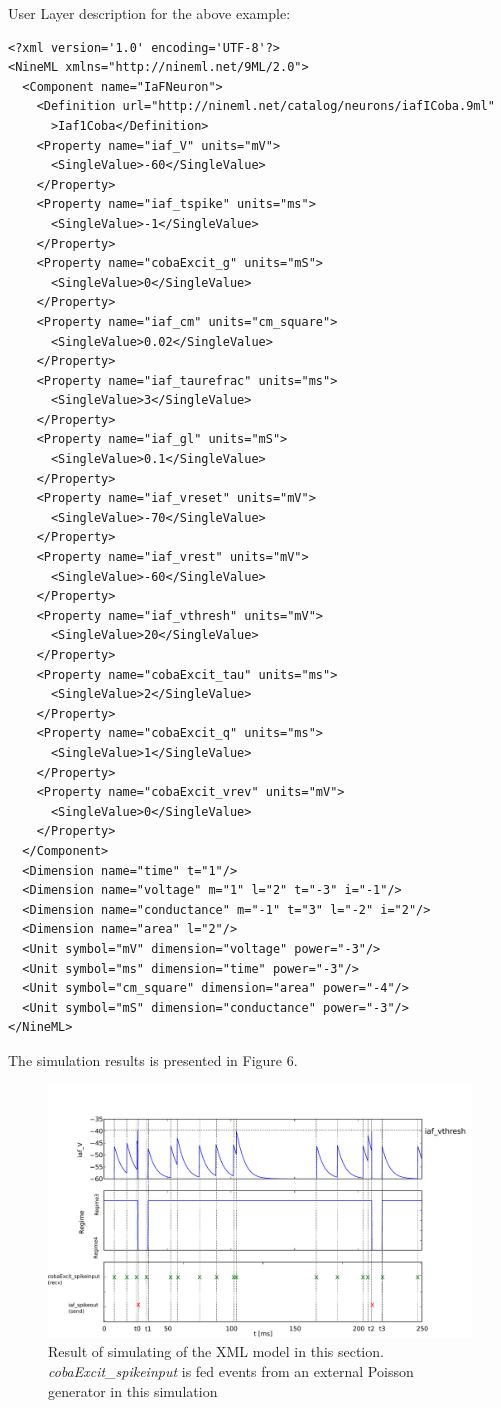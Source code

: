 \documentclass[draftspec]{ninemlspec}
\begin{document}
User Layer description for the above example:
\begin{lstlisting}
<?xml version='1.0' encoding='UTF-8'?>
<NineML xmlns="http://nineml.net/9ML/2.0">
  <Component name="IaFNeuron">
    <Definition url="http://nineml.net/catalog/neurons/iafICoba.9ml"
      >Iaf1Coba</Definition>
    <Property name="iaf_V" units="mV">
      <SingleValue>-60</SingleValue>
    </Property>
    <Property name="iaf_tspike" units="ms">
      <SingleValue>-1</SingleValue>
    </Property>
    <Property name="cobaExcit_g" units="mS">
      <SingleValue>0</SingleValue>
    </Property>
    <Property name="iaf_cm" units="cm_square">
      <SingleValue>0.02</SingleValue>
    </Property>
    <Property name="iaf_taurefrac" units="ms">
      <SingleValue>3</SingleValue>
    </Property>
    <Property name="iaf_gl" units="mS">
      <SingleValue>0.1</SingleValue>
    </Property>
    <Property name="iaf_vreset" units="mV">
      <SingleValue>-70</SingleValue>
    </Property>
    <Property name="iaf_vrest" units="mV">
      <SingleValue>-60</SingleValue>
    </Property>
    <Property name="iaf_vthresh" units="mV">
      <SingleValue>20</SingleValue>
    </Property>
    <Property name="cobaExcit_tau" units="ms">
      <SingleValue>2</SingleValue>
    </Property>
    <Property name="cobaExcit_q" units="ms">
      <SingleValue>1</SingleValue>
    </Property>
    <Property name="cobaExcit_vrev" units="mV">
      <SingleValue>0</SingleValue>
    </Property>
  </Component>
  <Dimension name="time" t="1"/>
  <Dimension name="voltage" m="1" l="2" t="-3" i="-1"/>
  <Dimension name="conductance" m="-1" t="3" l="-2" i="2"/>
  <Dimension name="area" l="2"/>
  <Unit symbol="mV" dimension="voltage" power="-3"/>
  <Unit symbol="ms" dimension="time" power="-3"/>
  <Unit symbol="cm_square" dimension="area" power="-4"/>
  <Unit symbol="mS" dimension="conductance" power="-3"/>
</NineML>
\end{lstlisting}

The simulation results is presented in Figure 6.
\begin{figure}[htb!]
\center
\includegraphics[width=14cm]{figures/demo2_Coba1_out.pdf}
\protect\caption{Result of simulating of the XML model in this section.
\emph{cobaExcit\_spikeinput} is fed events from an external Poisson generator
in this simulation}
\label{fig:EX2_Output}
\end{figure}
\end{document}

